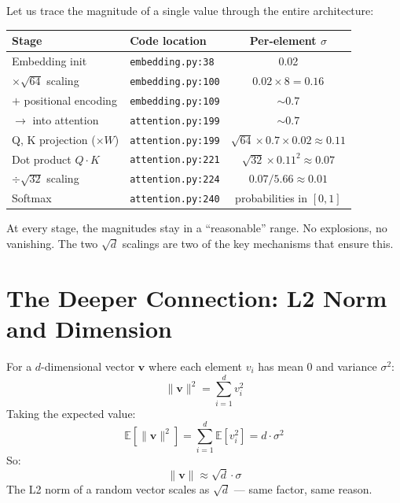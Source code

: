 \documentclass[11pt, a4paper]{article}
\begin{document}
\begin{application}
Let us trace the magnitude of a single value through the entire architecture:

\begin{center}
\begin{tabular}{llc}
\toprule
\textbf{Stage} & \textbf{Code location} & \textbf{Per-element $\sigma$} \\
\midrule
Embedding init & \texttt{embedding.py:38} & 0.02 \\
$\times \sqrt{64}$ scaling & \texttt{embedding.py:100} & $0.02 \times 8 = 0.16$ \\
$+$ positional encoding & \texttt{embedding.py:109} & $\sim 0.7$ \\
$\rightarrow$ into attention & \texttt{attention.py:199} & $\sim 0.7$ \\
Q, K projection ($\times W$) & \texttt{attention.py:199} & $\sqrt{64} \times 0.7 \times 0.02 \approx 0.11$ \\
Dot product $Q \cdot K$ & \texttt{attention.py:221} & $\sqrt{32} \times 0.11^2 \approx 0.07$ \\
$\div \sqrt{32}$ scaling & \texttt{attention.py:224} & $0.07 / 5.66 \approx 0.01$ \\
Softmax & \texttt{attention.py:240} & probabilities in $[0, 1]$ \\
\bottomrule
\end{tabular}
\end{center}

\noindent At every stage, the magnitudes stay in a ``reasonable'' range. No explosions, no vanishing.
The two $\sqrt{d}$ scalings are two of the key mechanisms that ensure this.
\end{application}


\section{The Deeper Connection: L2 Norm and Dimension}

\begin{formaldef}
For a $d$-dimensional vector $\bm{v}$ where each element $v_i$ has mean $0$ and variance $\sigma^2$:
\[
\|\bm{v}\|^2 = \sum_{i=1}^{d} v_i^2
\]
Taking the expected value:
\[
\mathbb{E}\!\left[\|\bm{v}\|^2\right] = \sum_{i=1}^{d} \mathbb{E}[v_i^2] = d \cdot \sigma^2
\]
So:
\[
\|\bm{v}\| \approx \sqrt{d} \cdot \sigma
\]
The L2 norm of a random vector scales as $\sqrt{d}$ --- same factor, same reason.
\end{formaldef}
\end{document}
